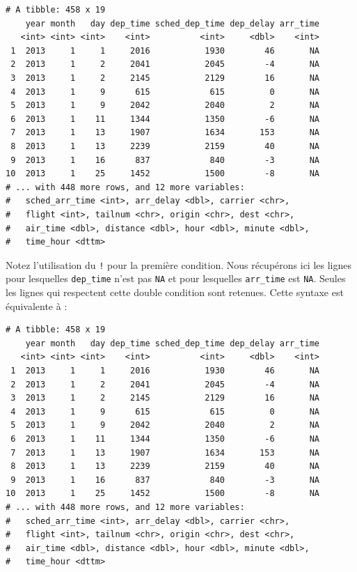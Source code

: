 \documentclass[a4paperpaper,]{article}
\newenvironment{Shaded}{\begin{snugshade}}{\end{snugshade}}
\newcommand{\KeywordTok}[1]{\textcolor[rgb]{0.12,0.11,0.11}{\textbf{#1}}}
\newcommand{\NormalTok}[1]{\textcolor[rgb]{0.12,0.11,0.11}{#1}}
\newcommand{\OperatorTok}[1]{\textcolor[rgb]{0.12,0.11,0.11}{#1}}
\newcommand{\StringTok}[1]{\textcolor[rgb]{0.75,0.01,0.01}{#1}}
\begin{document}
\begin{verbatim}
# A tibble: 458 x 19
    year month   day dep_time sched_dep_time dep_delay arr_time
   <int> <int> <int>    <int>          <int>     <dbl>    <int>
 1  2013     1     1     2016           1930        46       NA
 2  2013     1     2     2041           2045        -4       NA
 3  2013     1     2     2145           2129        16       NA
 4  2013     1     9      615            615         0       NA
 5  2013     1     9     2042           2040         2       NA
 6  2013     1    11     1344           1350        -6       NA
 7  2013     1    13     1907           1634       153       NA
 8  2013     1    13     2239           2159        40       NA
 9  2013     1    16      837            840        -3       NA
10  2013     1    25     1452           1500        -8       NA
# ... with 448 more rows, and 12 more variables:
#   sched_arr_time <int>, arr_delay <dbl>, carrier <chr>,
#   flight <int>, tailnum <chr>, origin <chr>, dest <chr>,
#   air_time <dbl>, distance <dbl>, hour <dbl>, minute <dbl>,
#   time_hour <dttm>
\end{verbatim}

Notez l'utilisation du \texttt{!} pour la première condition. Nous récupérons ici les lignes pour lesquelles \texttt{dep\_time} n'est pas \texttt{NA} et pour lesquelles \texttt{arr\_time} est \texttt{NA}. Seules les lignes qui respectent cette double condition sont retenues. Cette syntaxe est équivalente à :

\begin{Shaded}
\end{Shaded}

\begin{verbatim}
# A tibble: 458 x 19
    year month   day dep_time sched_dep_time dep_delay arr_time
   <int> <int> <int>    <int>          <int>     <dbl>    <int>
 1  2013     1     1     2016           1930        46       NA
 2  2013     1     2     2041           2045        -4       NA
 3  2013     1     2     2145           2129        16       NA
 4  2013     1     9      615            615         0       NA
 5  2013     1     9     2042           2040         2       NA
 6  2013     1    11     1344           1350        -6       NA
 7  2013     1    13     1907           1634       153       NA
 8  2013     1    13     2239           2159        40       NA
 9  2013     1    16      837            840        -3       NA
10  2013     1    25     1452           1500        -8       NA
# ... with 448 more rows, and 12 more variables:
#   sched_arr_time <int>, arr_delay <dbl>, carrier <chr>,
#   flight <int>, tailnum <chr>, origin <chr>, dest <chr>,
#   air_time <dbl>, distance <dbl>, hour <dbl>, minute <dbl>,
#   time_hour <dttm>
\end{verbatim}
\end{document}
